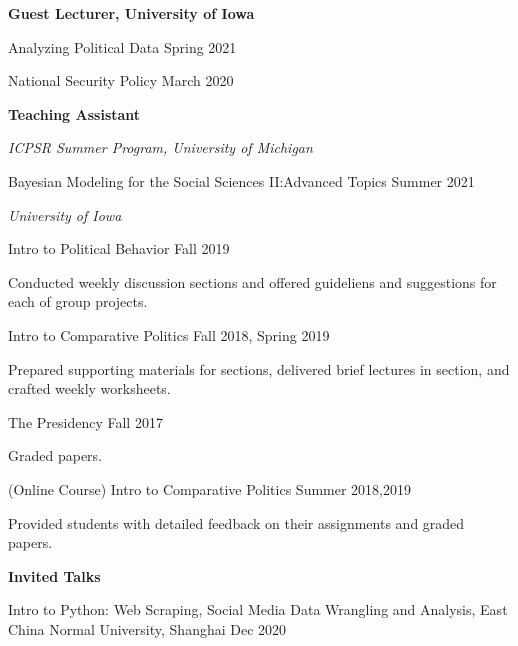 \documentclass[10.5pt,]{article}
\providecommand{\tightlist}{%
	\setlength{\itemsep}{0pt}\setlength{\parskip}{0pt}}
\renewenvironment{itemize}{
	\begin{list}{}{
			\setlength{\leftmargin}{1.5em}
		}
	}{
	\end{list}
}
\begin{document}
 \begin{itemize}
 \item
   \textbf{Guest Lecturer, University of Iowa}
 \item
   Analyzing Political Data \hfill Spring 2021
 \item
   National Security Policy \hfill March 2020
 \item
   \textbf{Teaching Assistant}
 \item
   \emph{ICPSR Summer Program, University of Michigan}

   \begin{itemize}
   \tightlist
   \item
     Bayesian Modeling for the Social Sciences II:Advanced Topics
     \hfill Summer 2021
   \end{itemize}
 \item
   \emph{University of Iowa}

   \begin{itemize}
   \tightlist
   \item
     Intro to Political Behavior \hfill Fall 2019

     \begin{itemize}
     \tightlist
     \item
       Conducted weekly discussion sections and offered guideliens and
       suggestions for each of group projects.
     \end{itemize}
   \item
     Intro to Comparative Politics \hfill Fall 2018, Spring 2019

     \begin{itemize}
     \tightlist
     \item
       Prepared supporting materials for sections, delivered brief
       lectures in section, and crafted weekly worksheets.
     \end{itemize}
   \item
     The Presidency \hfill Fall 2017

     \begin{itemize}
     \tightlist
     \item
       Graded papers.
     \end{itemize}
   \item
     (Online Course) Intro to Comparative Politics \hfill Summer
     2018,2019

     \begin{itemize}
     \tightlist
     \item
       Provided students with detailed feedback on their assignments and
       graded papers.
     \end{itemize}
   \end{itemize}
 \item
   \textbf{Invited Talks}
 \item
   Intro to Python: Web Scraping, Social Media Data Wrangling and
   Analysis, East China Normal University, Shanghai \hfill Dec 2020
 \end{itemize}
\end{document}
